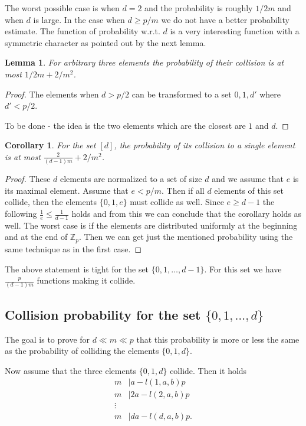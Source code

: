 \documentclass{article}
\newtheorem{lemma}{Lemma}
\newtheorem{corollary}{Corollary}
\begin{document}
The worst possible case is when $d = 2$ and the probability is roughly $1/2m$ and when $d$ is large.
In the case when $d \geq p/m$ we do not have a better probability estimate. The function of probability w.r.t. $d$ is a very interesting function with a symmetric character as pointed out by the next lemma.

\begin{lemma}
\label{lm:three-elements}
For arbitrary three elements the probability of their collision is at most $1/2m + 2/m^2$.
\end{lemma}
\begin{proof}
The elements when $d > p / 2$ can be transformed to a set $0, 1, d'$ where $d' < p / 2$.

To be done - the idea is the two elements which are the closest are $1$ and $d$.
\end{proof}

\begin{corollary}
\label{co:d-elements}
For the set $[d]$, the probability of its collision to a single element is at most $\frac{2}{(d - 1) m} + 2/m^2$.
\end{corollary}
\begin{proof}
These $d$ elements are normalized to a set of size $d$ and we assume that $e$ is its maximal element.
Assume that $e < p / m$. Then if all $d$ elements of this set collide, then the elements $\{0, 1, e\}$ must collide as well.
Since $e \geq d - 1$ the following $\frac{1}{e} \leq \frac{1}{d - 1}$ holds and from this we can conclude that the corollary holds as well.
The worst case is if the elements are distributed uniformly at the beginning and at the end of $\mathbb{Z}_p$.
Then we can get just the mentioned probability using the same technique as in the first case.
\end{proof}

The above statement is tight for the set $\{0, 1, \ldots, d - 1\}$.
For this set we have $\frac{p}{(d - 1)m}$ functions making it collide.

\subsection{Collision probability for the set $\{0, 1, \ldots, d\}$}

The goal is to prove for $d \ll m \ll p$ that this probability is more or less the same as the probability of colliding the elements $\{0, 1, d\}$.

Now assume that the three elements $\{0, 1, d\}$ collide.
Then it holds
\begin{align*}
m & \mid a - l(1, a, b)p \\
m & \mid 2a - l(2, a, b)p \\
\vdots & \\
m & \mid da - l(d, a, b)p.
\end{align*}
\end{document}
